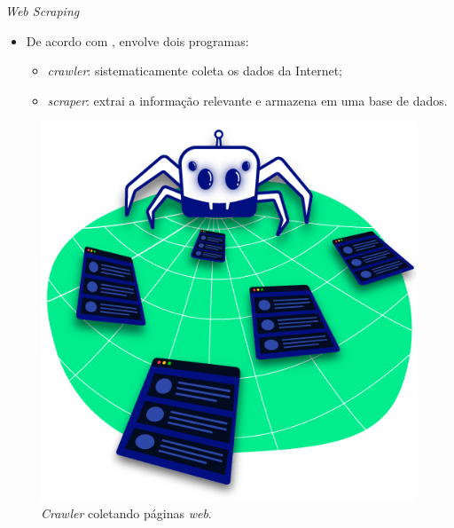 \documentclass[xcolor=table]{beamer}
\begin{document}
    \begin{frame}{\textit{Web Scraping}}
        \begin{itemize}
            \justifying
            \vspace{0.1cm}
            \item De acordo com \citet{lawson2015,patil2016}, envolve dois programas:
            \vspace{0.1cm}
            \begin{itemize}
                \item \textit{crawler}: sistematicamente coleta os dados da Internet;
                \item \textit{scraper}: extrai a informação relevante e armazena em uma base de dados.
            \end{itemize}
        \end{itemize}
        
        \begin{figure}
            \centering
            \includegraphics[scale=0.16]{figuras/spider_crawler.png}
	        \caption{\textit{Crawler} coletando páginas \textit{web}.}
        \end{figure}
    \end{frame}
\end{document}
